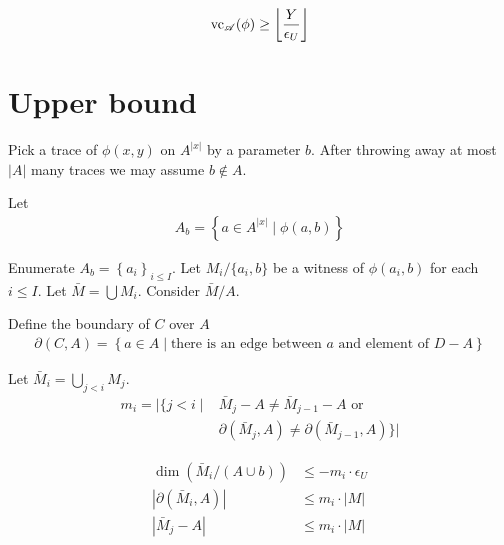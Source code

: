 \documentclass{amsart}
\renewcommand{\AA}{\mathscr A}
\newcommand{\curly}[1]{\left\{#1\right\}}
\providecommand{\floor}[1]{\left \lfloor #1 \right \rfloor }
\begin{document}
\begin{align*}
	\vc_\AA(\phi) \geq \floor{\frac{Y}{\epsilon_U}}
\end{align*}

\section{Upper bound}


Pick a trace of $\phi(x,y)$ on $A^{|x|}$ by a parameter $b$.
After throwing away at most $|A|$ many traces we may assume $b \notin A$.

Let
\begin{align*}
	A_b = \curly{a \in A^{|x|} \mid \phi(a, b)}
\end{align*}

Enumerate $A_b = \curly{a_i}_{i \leq I}$.
Let $M_i / \{a_i, b\}$ be a witness of $\phi(a_i, b)$ for each $i \leq I$.
Let $\bar M = \bigcup M_i$.
Consider $\bar M / A$.

\begin{Definition}
	Define the boundary of $C$ over $A$
	\begin{align*}
		\partial(C, A) = \curly{a \in A \mid \text{there is an edge between $a$ and element of $D - A$}}
	\end{align*}
\end{Definition}

Let $\bar M_i = \bigcup_{j < i} M_j$.
\begin{align*}
	m_i = |\{j < i \mid 
	&\bar M_j - A \neq \bar M_{j-1} - A \text{ or }\\
	&\partial(\bar M_j, A) \neq \partial(\bar M_{j-1}, A)\}|
\end{align*}

\begin{Lemma}
	\begin{align*}
		\dim(\bar M_i / (A \cup b)) &\leq -m_i \cdot \epsilon_U \\
		|\partial(\bar M_i, A)| &\leq m_i \cdot |M| \\
		|\bar M_j - A| &\leq m_i \cdot |M|
	\end{align*}
\end{Lemma}
\end{document}

